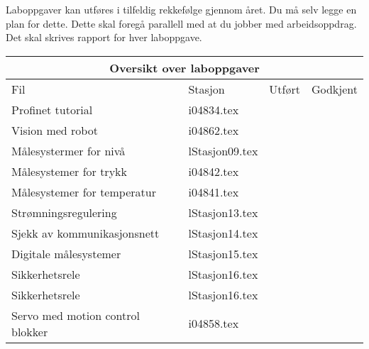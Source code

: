 Laboppgaver kan utføres i tilfeldig rekkefølge gjennom året. Du må selv legge en plan for dette. Dette skal foregå parallell med at du jobber med arbeidsoppdrag. Det skal skrives rapport for hver laboppgave.  
\begin{center}
	\begin{tabular}{| m{5cm} |m{2cm} |m{1cm} |m{2cm} |} 
\hline
	\multicolumn{4}{|c|}{\textbf{\cellcolor[HTML]{D5D5D5}Oversikt over laboppgaver}} \\
\hline
\hline
\rowcolor [HTML]{D5D5D5}
Fil	&Stasjon&Utført&Godkjent\\ \hline
		Profinet tutorial & i04834.tex & & \\ \cline{1-4}
		Vision med robot & i04862.tex & & \\ \cline{1-4}
		Målesystermer for nivå & lStasjon09.tex & & \\ \cline{1-4}
		Målesystemer for trykk & i04842.tex &  &\\ \cline{1-4}
		Målesystemer for temperatur & i04841.tex &  &\\ \cline{1-4}
		Strømningsregulering & lStasjon13.tex &  &\\ \cline{1-4}
		Sjekk av kommunikasjonsnett & lStasjon14.tex &  &\\ \cline{1-4}
		Digitale målesystemer & lStasjon15.tex &  &\\ \cline{1-4}
		Sikkerhetsrele & lStasjon16.tex &  &\\ \cline{1-4}
		Sikkerhetsrele & lStasjon16.tex &  &\\ \cline{1-4}
		Servo med motion control blokker & i04858.tex &  &\\ \cline{1-4}
		
\end{tabular}
\end{center}
\newpage
